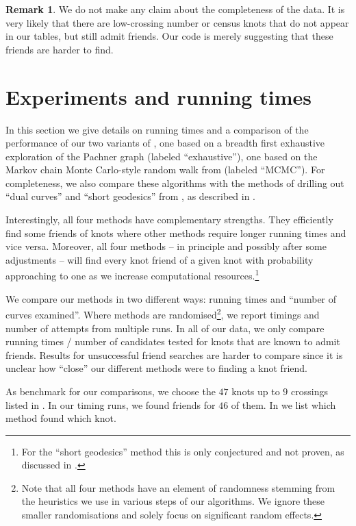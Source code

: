 \documentclass{amsart} %
\theoremstyle{thm}
\theoremstyle{definition}
\newtheorem{rem}[Theorem]{Remark}
\numberwithin{equation}{section}
\begin{document}
\begin{rem}
    We do not make any claim about the completeness of the data. It is very likely that there are low-crossing number or census knots that do not appear in our tables, but still admit friends. Our code is merely suggesting that these friends are harder to find.  
\end{rem} 


\section{Experiments and running times}\label{sec:runtime}

In this section we give details on running times and a comparison of the performance
of our two variants of , one based on a breadth first exhaustive
exploration of the Pachner graph (labeled ``exhaustive''), one based on the Markov chain Monte Carlo-style random walk from \cite{Altmann02012026} (labeled ``MCMC''). For completeness, we also compare these algorithms with the methods of drilling out 
``dual curves'' and ``short geodesics'' from \cite{Dunfield_exterior_to_link,Dunfield_Gong}, as described in .

Interestingly, all four methods have complementary strengths. They efficiently find 
some friends of knots where other methods require longer running times and vice
versa. Moreover, all four methods -- in principle and possibly after some adjustments -- will find every knot friend of a given knot with probability approaching to one as we increase computational resources.\footnote{For the ``short geodesics'' method this is only conjectured and not proven, as discussed in .}

We compare our methods in two different ways: running times and ``number of curves examined''. Where 
methods are randomised\footnote{Note that all four methods have an element of randomness stemming from the heuristics we use in various steps of our algorithms. We ignore these smaller randomisations and solely focus on significant random effects.}, we report timings and number of attempts from multiple runs. In all of our data, we only compare running times / number of candidates tested for knots that are known to admit friends. Results for unsuccessful friend searches are harder to compare since it is unclear how ``close'' our different methods were to finding a knot friend.

As benchmark for our comparisons, we choose the $47$ knots up to $9$ crossings listed in . In our timing runs, we found friends for $46$ of them. In  we list which method found which knot.
\end{document}
